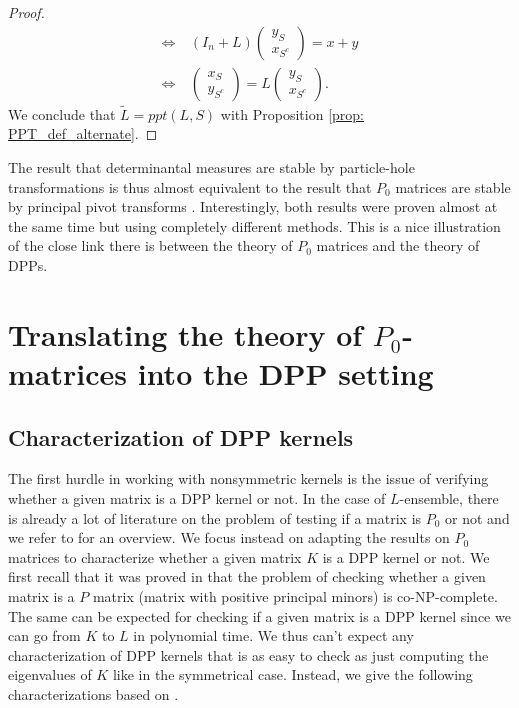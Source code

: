 \documentclass{article}
\numberwithin{equation}{section}
\renewcommand{\tilde}{\widetilde}
\theoremstyle{plain}
\begin{document}
\begin{proof}
\begin{align*}
\Leftrightarrow~ & (I_n+L)\begin{pmatrix} y_S \\ x_{S^c} \end{pmatrix}=x+y\\
\Leftrightarrow~ & \begin{pmatrix} x_S \\ y_{S^c} \end{pmatrix} = L\begin{pmatrix} y_S \\ x_{S^c} \end{pmatrix}.
\end{align*}
We conclude that $\tilde L = ppt(L, S)$ with Proposition \ref{prop: PPT_def_alternate}.
\end{proof}

\noindent The result that determinantal measures are stable by particle-hole transformations \cite{Borodin99} is thus almost equivalent to the result that $P_0$ matrices are stable by principal pivot transforms \cite[Theorem 4.8.4]{Johnson20}. Interestingly, both results were proven almost at the same time but using completely different methods. This is a nice illustration of the close link there is between the theory of $P_0$ matrices and the theory of DPPs.

\section{Translating the theory of \texorpdfstring{$P_0$}{P0}-matrices into the DPP setting}\label{sec: Properties}

\subsection{Characterization of DPP kernels}

The first hurdle in working with nonsymmetric kernels is the issue of verifying whether a given matrix is a DPP kernel or not. In the case of $L$-ensemble, there is already a lot of literature on the problem of testing if a matrix is $P_0$ or not and we refer to \cite[Section 4.6]{Johnson20} for an overview. We focus instead on adapting the results on $P_0$ matrices to characterize whether a given matrix $K$ is a DPP kernel or not. We first recall that it was proved in \cite{Coxson} that the problem of checking whether a given matrix is a $P$ matrix (matrix with positive principal minors) is co-NP-complete. The same can be expected for checking if a given matrix is a DPP kernel since we can go from $K$ to $L$ in polynomial time. We thus can't expect any characterization of DPP kernels that is as easy to check as just computing the eigenvalues of $K$ like in the symmetrical case. Instead, we give the following characterizations based on \cite[Theorem 4.3.4 and Theorem 4.3.9]{Johnson20}.
\end{document}
